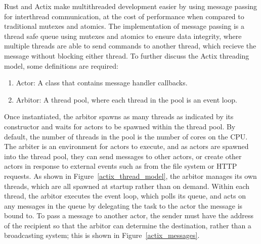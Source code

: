 Rust and Actix make multithreaded development easier by using message passing for interthread communication, at the cost of performance when compared to traditional mutexes and atomics.
The implementation of message passing is a thread safe queue using mutexes and atomics to ensure data integrity, where multiple threads are able to send commands to another thread, which recieve the message without blocking either thread.
To further discuss the Actix threading model, some definitions are required:
\begin{enumerate}
	\item Actor: A class that contains message handler callbacks.
	\item Arbitor: A thread pool, where each thread in the pool is an event loop.
\end{enumerate}
Once instantiated, the arbitor spawns as many threads as indicated by its constructor and waits for actors to be spawned within the thread pool.
By default, the number of threads in the pool is the number of cores on the CPU.
The arbiter is an environment for actors to execute, and as actors are spawned into the thread pool, they can send messages to other actors, or create other actors in response to external events such as from the file system or HTTP requests.
As shown in Figure~\ref{actix_thread_model}, the arbitor manages its own threads, which are all spawned at startup rather than on demand.
Within each thread, the arbitor executes the event loop, which polls its queue, and acts on any messages in the queue by delegating the task to the actor the message is bound to.
To pass a message to another actor, the sender must have the address of the recipient so that the arbitor can determine the destination, rather than a broadcasting system; this is shown in Figure~\ref{actix_messages}.

